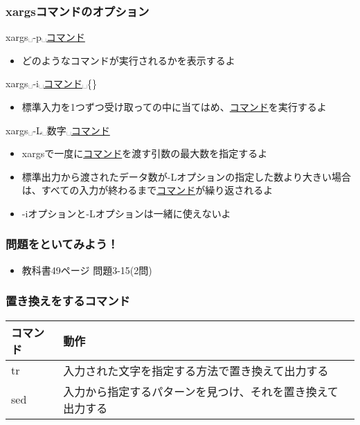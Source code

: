 \begin{frame}
    \frametitle{xargsコマンドのオプション}
    xargs␣-p␣\underline{コマンド}
    \begin{itemize}
        \item どのようなコマンドが実行されるかを表示するよ
    \end{itemize}
    xargs␣-i␣\underline{コマンド}␣\{\}
    \begin{itemize}
        \item 標準入力を1つずつ受け取って{}の中に当てはめ、\underline{コマンド}を実行するよ
    \end{itemize}
    xargs␣-L␣数字␣\underline{コマンド}
    \begin{itemize}
        \item xargsで一度に\underline{コマンド}を渡す引数の最大数を指定するよ
        \item 標準出力から渡されたデータ数が-Lオプションの指定した数より大きい場合は、すべての入力が終わるまで\underline{コマンド}が繰り返されるよ
        \item -iオプションと-Lオプションは一緒に使えないよ
    \end{itemize}
\end{frame}

\begin{frame}
    \frametitle{問題をといてみよう！}
    \begin{itemize}
        \item 教科書49ページ 問題3-15(2問)
    \end{itemize}
\end{frame}

\begin{frame}
    \frametitle{置き換えをするコマンド}
    \footnotesize
    \begin{tabular}{ll}
        コマンド & 動作                                                       \\ \hline
        tr       & 入力された文字を指定する方法で置き換えて出力する           \\
        sed      & 入力から指定するパターンを見つけ、それを置き換えて出力する \\ \hline
    \end{tabular}
\end{frame}

